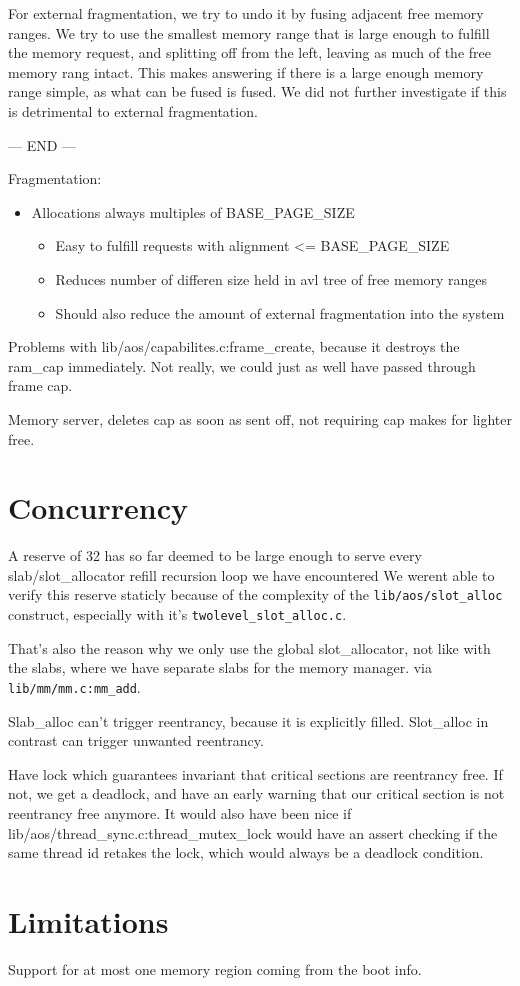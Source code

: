 For external fragmentation, we try to undo it by fusing adjacent free memory
ranges.
We try to use the smallest memory range that is large enough to fulfill the
memory request, and splitting off from the left, leaving as much of the free
memory rang intact.
This makes answering if there is a large enough memory range simple, as what
can be fused is fused.
We did not further investigate if this is detrimental to external fragmentation.

--- END ---

Fragmentation:
\begin{itemize}
	\item Allocations always multiples of BASE\_PAGE\_SIZE
	\begin{itemize}
		\item Easy to fulfill requests with alignment <= BASE\_PAGE\_SIZE
		\item Reduces number of differen size held in avl tree of free memory ranges
		\item Should also reduce the amount of external fragmentation into the system
	\end{itemize}
\end{itemize}

Problems with lib/aos/capabilites.c:frame\_create, because it destroys the ram\_cap
immediately. Not really, we could just as well have passed through frame cap.

Memory server, deletes cap as soon as sent off, not requiring cap makes for lighter
free.

\section{Concurrency}\label{mem-con}

A reserve of 32 has so far deemed to be large enough to serve every
slab/slot\_allocator refill recursion loop we have encountered
We werent able to verify this reserve staticly because of the complexity of the
\verb|lib/aos/slot_alloc| construct, especially with it's
\verb|twolevel_slot_alloc.c|.

That's also the reason why we only use the global slot\_allocator, not like with
the slabs, where we have separate slabs for the memory manager.
via \verb|lib/mm/mm.c:mm_add|.

Slab\_alloc can't trigger reentrancy, because it is explicitly filled. Slot\_alloc
in contrast can trigger unwanted reentrancy.

Have lock which guarantees invariant that critical sections are reentrancy free.
If not, we get a deadlock, and have an early warning that our critical section
is not reentrancy free anymore.
It would also have been nice if lib/aos/thread\_sync.c:thread\_mutex\_lock would
have an assert checking if the same thread id retakes the lock, which would
always be a deadlock condition.

\section{Limitations}

Support for at most one memory region coming from the boot info.
